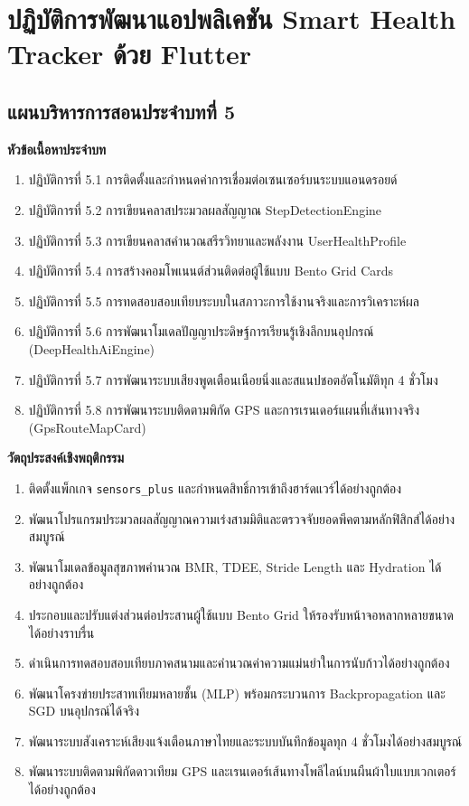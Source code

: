 \chapter{ปฏิบัติการพัฒนาแอปพลิเคชัน Smart Health Tracker ด้วย Flutter}
\label{chap:ch05}

\section*{แผนบริหารการสอนประจำบทที่ 5}

\noindent\textbf{หัวข้อเนื้อหาประจำบท}
\begin{enumerate}
    \item ปฏิบัติการที่ 5.1 การติดตั้งและกำหนดค่าการเชื่อมต่อเซนเซอร์บนระบบแอนดรอยด์
    \item ปฏิบัติการที่ 5.2 การเขียนคลาสประมวลผลสัญญาณ StepDetectionEngine
    \item ปฏิบัติการที่ 5.3 การเขียนคลาสคำนวณสรีรวิทยาและพลังงาน UserHealthProfile
    \item ปฏิบัติการที่ 5.4 การสร้างคอมโพเนนต์ส่วนติดต่อผู้ใช้แบบ Bento Grid Cards
    \item ปฏิบัติการที่ 5.5 การทดสอบสอบเทียบระบบในสภาวะการใช้งานจริงและการวิเคราะห์ผล
    \item ปฏิบัติการที่ 5.6 การพัฒนาโมเดลปัญญาประดิษฐ์การเรียนรู้เชิงลึกบนอุปกรณ์ (DeepHealthAiEngine)
    \item ปฏิบัติการที่ 5.7 การพัฒนาระบบเสียงพูดเตือนเนือยนิ่งและสแนปชอตอัตโนมัติทุก 4 ชั่วโมง
    \item ปฏิบัติการที่ 5.8 การพัฒนาระบบติดตามพิกัด GPS และการเรนเดอร์แผนที่เส้นทางจริง (GpsRouteMapCard)
\end{enumerate}

\noindent\textbf{วัตถุประสงค์เชิงพฤติกรรม}
\begin{enumerate}
    \item ติดตั้งแพ็กเกจ \texttt{sensors\_plus} และกำหนดสิทธิ์การเข้าถึงฮาร์ดแวร์ได้อย่างถูกต้อง
    \item พัฒนาโปรแกรมประมวลผลสัญญาณความเร่งสามมิติและตรวจจับยอดพีคตามหลักฟิสิกส์ได้อย่างสมบูรณ์
    \item พัฒนาโมเดลข้อมูลสุขภาพคำนวณ BMR, TDEE, Stride Length และ Hydration ได้อย่างถูกต้อง
    \item ประกอบและปรับแต่งส่วนต่อประสานผู้ใช้แบบ Bento Grid ให้รองรับหน้าจอหลากหลายขนาดได้อย่างราบรื่น
    \item ดำเนินการทดสอบสอบเทียบภาคสนามและคำนวณค่าความแม่นยำในการนับก้าวได้อย่างถูกต้อง
    \item พัฒนาโครงข่ายประสาทเทียมหลายชั้น (MLP) พร้อมกระบวนการ Backpropagation และ SGD บนอุปกรณ์ได้จริง
    \item พัฒนาระบบสังเคราะห์เสียงแจ้งเตือนภาษาไทยและระบบบันทึกข้อมูลทุก 4 ชั่วโมงได้อย่างสมบูรณ์
    \item พัฒนาระบบติดตามพิกัดดาวเทียม GPS และเรนเดอร์เส้นทางโพลีไลน์บนผืนผ้าใบแบบเวกเตอร์ได้อย่างถูกต้อง
\end{enumerate}

